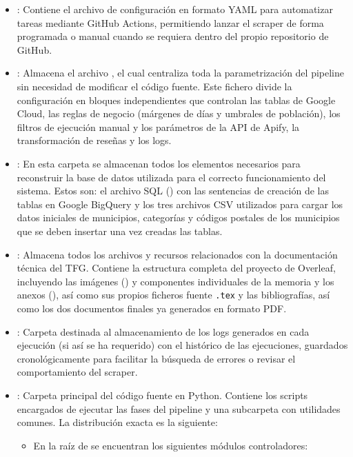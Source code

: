 \begin{itemize}
    \item {}: Contiene el archivo de configuración  en formato YAML para automatizar tareas mediante GitHub Actions, permitiendo lanzar el scraper de forma programada o manual cuando se requiera dentro del propio repositorio de GitHub.
    \item {}: Almacena el archivo , el cual centraliza toda la parametrización del pipeline sin necesidad de modificar el código fuente. Este fichero divide la configuración en bloques independientes que controlan las tablas de Google Cloud, las reglas de negocio (márgenes de días y umbrales de población), los filtros de ejecución manual y los parámetros de la API de Apify, la transformación de reseñas y los logs.
    \item {}: En esta carpeta se almacenan todos los elementos necesarios para reconstruir la base de datos utilizada para el correcto funcionamiento del sistema. Estos son: el archivo SQL () con las sentencias de creación de las tablas en Google BigQuery y los tres archivos CSV utilizados para cargar los datos iniciales de municipios, categorías y códigos postales de los municipios que se deben insertar una vez creadas las tablas.
    \item {}: Almacena todos los archivos y recursos relacionados con la documentación técnica del TFG. Contiene la estructura completa del proyecto de Overleaf, incluyendo las imágenes () y componentes individuales de la memoria y los anexos (), así como sus propios ficheros fuente \texttt{.tex} y las bibliografías, así como los dos documentos finales ya generados en formato PDF.
    \item {}: Carpeta destinada al almacenamiento de los logs generados en cada ejecución (si así se ha requerido) con el histórico de las ejecuciones, guardados cronológicamente para facilitar la búsqueda de errores o revisar el comportamiento del scraper.
    \item {}: Carpeta principal del código fuente en Python. Contiene los scripts encargados de ejecutar las fases del pipeline y una subcarpeta con utilidades comunes. La distribución exacta es la siguiente:
    \begin{itemize}
        \item En la raíz de  se encuentran los siguientes módulos controladores:
        \begin{itemize}

\end{itemize}
\end{itemize}
\end{itemize}
